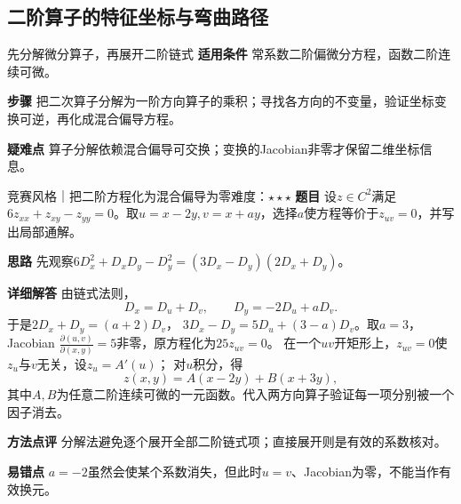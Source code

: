 \subsection{二阶算子的特征坐标与弯曲路径}\label{cmv:operators}
\begin{method}{先分解微分算子，再展开二阶链式}
\textbf{适用条件} 常系数二阶偏微分方程，函数二阶连续可微。\par
\textbf{步骤} 把二次算子分解为一阶方向算子的乘积；寻找各方向的不变量，验证坐标变换可逆，再化成混合偏导方程。\par
\textbf{疑难点} 算子分解依赖混合偏导可交换；变换的Jacobian非零才保留二维坐标信息。
\end{method}
\begin{example}{竞赛风格｜把二阶方程化为混合偏导为零}{难度：$\star\star\star$}
\label{cmv:ex:operator}
\textbf{题目} 设$z\in C^2$满足$6z_{xx}+z_{xy}-z_{yy}=0$。取$u=x-2y,v=x+ay$，选择$a$使方程等价于$z_{uv}=0$，并写出局部通解。\par
\textbf{思路} 先观察$6D_x^2+D_xD_y-D_y^2=(3D_x-D_y)(2D_x+D_y)$。\par
\textbf{详细解答} 由链式法则，
\[
D_x=D_u+D_v,\qquad D_y=-2D_u+aD_v.
\]
于是$2D_x+D_y=(a+2)D_v$，
$3D_x-D_y=5D_u+(3-a)D_v$。取$a=3$，Jacobian
$\frac{\partial(u,v)}{\partial(x,y)}=5$非零，原方程化为$25z_{uv}=0$。
在一个$uv$开矩形上，$z_{uv}=0$使$z_u$与$v$无关，设$z_u=A'(u)$；
对$u$积分，得
\[
z(x,y)=A(x-2y)+B(x+3y),
\]
其中$A,B$为任意二阶连续可微的一元函数。代入两方向算子验证每一项分别被一个因子消去。\par
\textbf{方法点评} 分解法避免逐个展开全部二阶链式项；直接展开则是有效的系数核对。\par
\textbf{易错点} $a=-2$虽然会使某个系数消失，但此时$u=v$、Jacobian为零，不能当作有效换元。
\end{example}

